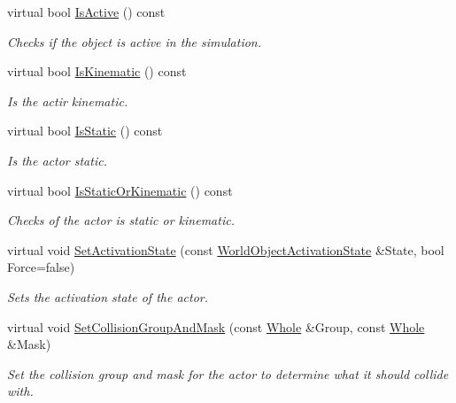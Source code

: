 \begin{DoxyCompactItemize}
virtual bool \hyperlink{classMezzanine_1_1WorldObjectPhysicsSettings_a9933baf62361c7e32eff29dce6219d2c}{IsActive} () const 
\begin{DoxyCompactList}\small\item\em Checks if the object is active in the simulation. \item\end{DoxyCompactList}\item 
virtual bool \hyperlink{classMezzanine_1_1WorldObjectPhysicsSettings_a0c9e2839266e49d073c09d9396eab600}{IsKinematic} () const 
\begin{DoxyCompactList}\small\item\em Is the actir kinematic. \item\end{DoxyCompactList}\item 
virtual bool \hyperlink{classMezzanine_1_1WorldObjectPhysicsSettings_ad66ee17bc6331910a1a1bb583fe2b424}{IsStatic} () const 
\begin{DoxyCompactList}\small\item\em Is the actor static. \item\end{DoxyCompactList}\item 
virtual bool \hyperlink{classMezzanine_1_1WorldObjectPhysicsSettings_adb5ca51d40befb558cc5b1b85ef8b092}{IsStaticOrKinematic} () const 
\begin{DoxyCompactList}\small\item\em Checks of the actor is static or kinematic. \item\end{DoxyCompactList}\item 
virtual void \hyperlink{classMezzanine_1_1WorldObjectPhysicsSettings_ae90ebe8b69ab256702f178c71cf1af47}{SetActivationState} (const \hyperlink{namespaceMezzanine_ac4d9d4570b1963390325ad6a083108e1}{WorldObjectActivationState} \&State, bool Force=false)
\begin{DoxyCompactList}\small\item\em Sets the activation state of the actor. \item\end{DoxyCompactList}\item 
virtual void \hyperlink{classMezzanine_1_1WorldObjectPhysicsSettings_a46d794796272ed68fffb32a91d4a6420}{SetCollisionGroupAndMask} (const \hyperlink{namespaceMezzanine_adcbb6ce6d1eb4379d109e51171e2e493}{Whole} \&Group, const \hyperlink{namespaceMezzanine_adcbb6ce6d1eb4379d109e51171e2e493}{Whole} \&Mask)
\begin{DoxyCompactList}\small\item\em Set the collision group and mask for the actor to determine what it should collide with. \item\end{DoxyCompactList}\item 

\end{DoxyCompactItemize}
